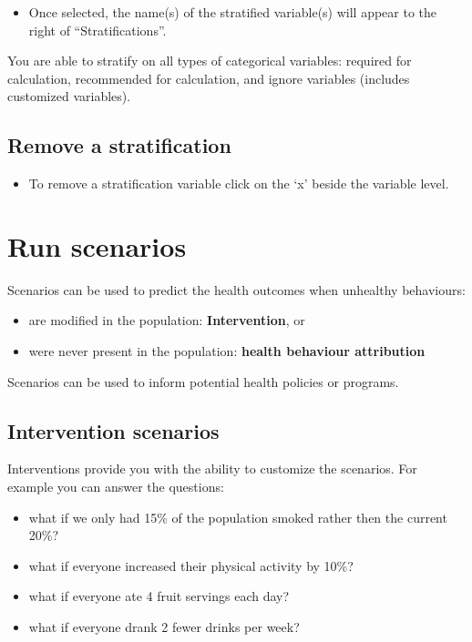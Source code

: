 \documentclass[]{book}
\providecommand{\tightlist}{%
  \setlength{\itemsep}{0pt}\setlength{\parskip}{0pt}}
\begin{document}
\begin{itemize}
\tightlist
\item
  Once selected, the name(s) of the stratified variable(s) will appear
  to the right of ``Stratifications''.
\end{itemize}

You are able to stratify on all types of categorical variables: required
for calculation, recommended for calculation, and ignore variables
(includes customized variables).

\subsection{Remove a stratification}\label{remove-a-stratification}

\begin{itemize}
\tightlist
\item
  To remove a stratification variable click on the `x' beside the
  variable level.
\end{itemize}

\section{Run scenarios}\label{run-scenarios}

Scenarios can be used to predict the health outcomes when unhealthy
behaviours:

\begin{itemize}
\tightlist
\item
  are modified in the population: \textbf{Intervention}, or
\item
  were never present in the population: \textbf{health behaviour
  attribution}
\end{itemize}

Scenarios can be used to inform potential health policies or programs.

\subsection{Intervention scenarios}\label{intervention-scenarios}

Interventions provide you with the ability to customize the scenarios.
For example you can answer the questions:

\begin{itemize}
\tightlist
\item
  what if we only had 15\% of the population smoked rather then the
  current 20\%?
\item
  what if everyone increased their physical activity by 10\%?
\item
  what if everyone ate 4 fruit servings each day?
\item
  what if everyone drank 2 fewer drinks per week?
\end{itemize}
\end{document}
